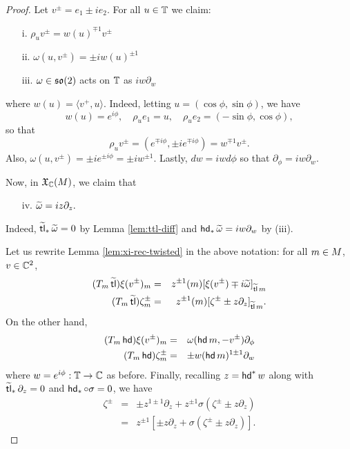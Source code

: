 \begin{proof}
Let $v^\pm= e_1\pm ie_2$. For all $u\in{\mathbb{T}}$ we claim:
\begin{enumerate}
        \item[i.] $\rho_u v^\pm  = w(u)^{\mp1} v^\pm $
        \item[ii.] $\omega(u,v^\pm) = \pm i w(u)^{\pm1} $
        \item[iii.] $\omega\in\mathfrak{so}(2)$ acts on ${\mathbb{T}}$ as $iw \partial_w$
\end{enumerate}
where $w(u) =\langle v^+,u\rangle$. Indeed, letting $u = (\cos\phi,\sin\phi)$,
we have \[
        w(u) = e^{i\phi},\quad
\rho_u e_1=u,\quad \rho_u e_2 = (-\sin\phi,\cos\phi),
\]
so that
\[
    \rho_u v^\pm = (e^{\mp i\phi}, \pm i e^{\mp i\phi}) = w^{\mp 1} v^\pm.
\]
Also, $\omega(u,v^\pm)= \pm i e^{\pm i\phi} = \pm i w^{\pm1}$. Lastly, $dw = i w d\phi$ so that
$\partial_\phi = iw \partial_w$.

Now, in $\mathfrak{X}_{{\mathbb{C}}}(M)$, we claim that
\begin{enumerate}
        \item[iv.] $\widetilde{\omega} = iz \partial_z.$
\end{enumerate}
Indeed, $\operatorname{\widetilde{\operatorname{\mathsf{tl}}}}_* \widetilde{\omega} = 0$ by Lemma \ref{lem:ttl-diff} and $\operatorname{\mathsf{hd}}_* \widetilde{\omega} = iw \partial_w$ by (iii).

Let us rewrite Lemma \ref{lem:xi-rec-twisted} in the above notation: for all
$m\in M$, $v\in{\mathbb{C}}^2$,
\begin{eqnarray*}
        (T_m \operatorname{\widetilde{\operatorname{\mathsf{tl}}}}) \xi(v^\pm)_m &=& z^{\pm1}(m) [ \xi(v^\pm) \mp i \widetilde{\omega} ]_{\operatorname{\widetilde{\operatorname{\mathsf{tl}}}} m} \\
        (T_m \operatorname{\widetilde{\operatorname{\mathsf{tl}}}}) \zeta^\pm_m  &=& z^{\pm1}(m) [ \zeta^\pm \pm z \partial_z ]_{\operatorname{\widetilde{\operatorname{\mathsf{tl}}}} m}.
\end{eqnarray*}
On the other hand,
\begin{eqnarray*}
        (T_m \operatorname{\mathsf{hd}}) \xi(v^\pm)_m  &=& \omega(\operatorname{\mathsf{hd}} m, -v^\pm) \partial_\phi  \\
        (T_m \operatorname{\mathsf{hd}}) \zeta^\pm_m   &=& \pm w(\operatorname{\mathsf{hd}} m)^{1\pm1} \partial_w
\end{eqnarray*}
where $w = e^{i\phi} : {\mathbb{T}} \to {\mathbb{C}}$ as before. Finally, recalling $z = \operatorname{\mathsf{hd}}^* w$ along
with $\operatorname{\widetilde{\operatorname{\mathsf{tl}}}}_*\partial_z=0$ and $\operatorname{\mathsf{hd}}_* \circ\sigma = 0$, we have 
\begin{eqnarray*}
        \zeta^\pm &=& \pm z^{1\pm1} \partial_z + z^{\pm1} \sigma ( \zeta^\pm \pm z \partial_z )\\
        &=& z^{\pm1} [ \pm z \partial_z + \sigma (\zeta^\pm \pm z \partial_z) ]. 
\end{eqnarray*}
\end{proof}

